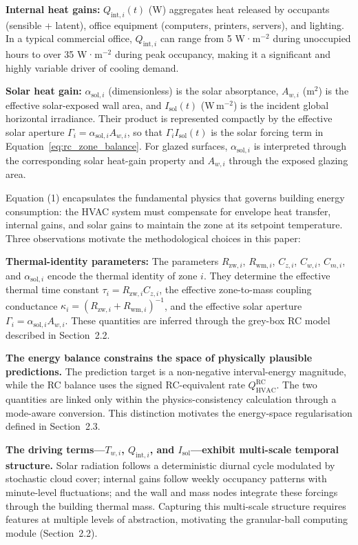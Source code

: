 \documentclass[11pt]{article}
\begin{document}
\textbf{Internal heat gains:} $Q_{\text{int},i}(t)$ (W) aggregates heat released by occupants (sensible + latent), office equipment (computers, printers, servers), and lighting. In a typical commercial office, $Q_{\text{int},i}$ can range from 5 W·m$^{-2}$ during unoccupied hours to over 35 W·m$^{-2}$ during peak occupancy, making it a significant and highly variable driver of cooling demand.

\textbf{Solar heat gain:} $\alpha_{\mathrm{sol},i}$ (dimensionless) is the solar absorptance, $A_{w,i}$ (m$^2$) is the effective solar-exposed wall area, and $I_{\mathrm{sol}}(t)$ (W\,m$^{-2}$) is the incident global horizontal irradiance. Their product is represented compactly by the effective solar aperture $\Gamma_i=\alpha_{\mathrm{sol},i}A_{w,i}$, so that $\Gamma_i I_{\mathrm{sol}}(t)$ is the solar forcing term in Equation~\eqref{eq:rc_zone_balance}. For glazed surfaces, $\alpha_{\mathrm{sol},i}$ is interpreted through the corresponding solar heat-gain property and $A_{w,i}$ through the exposed glazing area.

Equation (1) encapsulates the fundamental physics that governs building energy consumption: the HVAC system must compensate for envelope heat transfer, internal gains, and solar gains to maintain the zone at its setpoint temperature. Three observations motivate the methodological choices in this paper:

\textbf{Thermal-identity parameters:} The parameters $R_{\mathrm{zw},i}$, $R_{\mathrm{wm},i}$, $C_{z,i}$, $C_{w,i}$, $C_{m,i}$, and $\alpha_{\mathrm{sol},i}$ encode the thermal identity of zone $i$. They determine the effective thermal time constant $\tau_i=R_{\mathrm{zw},i}C_{z,i}$, the effective zone-to-mass coupling conductance $\kappa_i=(R_{\mathrm{zw},i}+R_{\mathrm{wm},i})^{-1}$, and the effective solar aperture $\Gamma_i=\alpha_{\mathrm{sol},i}A_{w,i}$. These quantities are inferred through the grey-box RC model described in Section~2.2.

\textbf{The energy balance constrains the space of physically plausible predictions.} The prediction target is a non-negative interval-energy magnitude, while the RC balance uses the signed RC-equivalent rate $Q_{\mathrm{HVAC}}^{\mathrm{RC}}$. The two quantities are linked only within the physics-consistency calculation through a mode-aware conversion. This distinction motivates the energy-space regularisation defined in Section~2.3.

\textbf{The driving terms---$T_{w,i}$, $Q_{\mathrm{int},i}$, and $I_{\mathrm{sol}}$---exhibit multi-scale temporal structure.} Solar radiation follows a deterministic diurnal cycle modulated by stochastic cloud cover; internal gains follow weekly occupancy patterns with minute-level fluctuations; and the wall and mass nodes integrate these forcings through the building thermal mass. Capturing this multi-scale structure requires features at multiple levels of abstraction, motivating the granular-ball computing module (Section~2.2).
\end{document}
